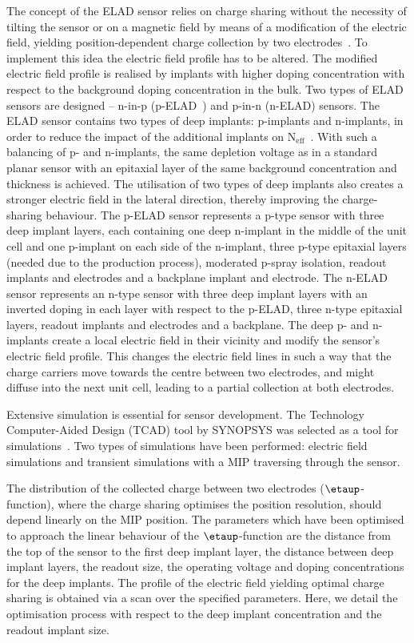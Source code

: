 \documentclass[a4paper,11pt]{article}
\begin{document}
The concept of the ELAD sensor relies on charge sharing without the necessity of tilting the sensor or on a magnetic field by means of a modification of the electric field,
 yielding position-dependent charge collection by two electrodes~\cite{hj}.
To implement this idea the electric field profile has to be altered.
The modified electric field profile is realised by implants with higher doping concentration with respect to the background doping concentration in the bulk. 
Two types of ELAD sensors are designed -- n-in-p (p-ELAD~\cite{elad}) and p-in-n (n-ELAD) sensors. 
The ELAD sensor contains two types of deep implants: p-implants and n-implants, in order to reduce the impact of the additional implants on $\mathrm{N_{eff}}$~\cite{elad}. 
With such a balancing of p- and n-implants, the same depletion voltage as in a standard planar sensor with an epitaxial layer of the same background concentration and thickness is achieved.
The utilisation of two types of deep implants also creates a stronger electric field in the lateral direction, thereby improving the charge-sharing behaviour.
The p-ELAD sensor represents a p-type sensor with three deep implant layers, each containing one deep n-implant in the middle of the unit cell and one p-implant on each side of the n-implant,
 three p-type epitaxial layers (needed due to the production process), moderated p-spray isolation, readout implants and electrodes and a backplane implant and electrode.
The n-ELAD sensor represents an n-type sensor with three deep implant layers with an inverted doping in each layer with respect to the p-ELAD, three n-type epitaxial layers, readout implants and electrodes and a backplane.
The deep p- and n-implants create a local electric field in their vicinity and modify the sensor's electric field profile.
This changes the electric field lines in such a way that the charge carriers move towards the centre between two electrodes, and might diffuse into the next unit cell, leading to a partial collection at both electrodes.

Extensive simulation is essential for sensor development. 
The Technology Computer-Aided Design (TCAD) tool by SYNOPSYS was selected as a tool for simulations~\cite{syn}.
Two types of simulations have been performed: electric field simulations and transient simulations with a MIP traversing through the sensor.

The distribution of the collected charge between two electrodes ($\etaup$-function), where the charge sharing optimises the position resolution, should depend linearly on the MIP position. 
The parameters which have been optimised to approach the linear behaviour of the $\etaup$-function are the distance from the top of the sensor to the first deep implant layer, the distance between deep implant layers,
 the readout size, the operating voltage and doping concentrations for the deep implants. 
The profile of the electric field yielding optimal charge sharing is obtained via a scan over the specified parameters.
Here, we detail the optimisation process with respect to the deep implant concentration and the readout implant size.
\end{document}
